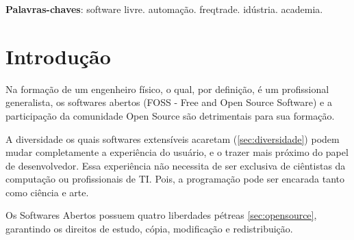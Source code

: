 \documentclass[
12pt,				%
openright,			%
oneside,			%
a4paper,			%
english,			%
french,				%
spanish,			%
brazil,				%
]{abntex2}
\begin{document}

\frenchspacing


\imprimircapa


\setlength{\absparsep}{18pt} %
\begin{resumo}
  
  
  \noindent
  \textbf{Palavras-chaves}: software livre. automação. freqtrade. idústria. academia.

\end{resumo}


\tableofcontents*


\textual

\chapter[Introdução]{Introdução}

Na formação de um engenheiro físico, o qual, por definição, é um profissional generalista, os softwares abertos (FOSS - Free and Open Source Software) e a participação da comunidade Open Source são detrimentais para sua formação.

A diversidade os quais softwares extensíveis acaretam (\autoref{sec:diversidade}) podem mudar completamente a experiência do usuário, e o trazer mais próximo do papel de desenvolvedor. Essa experiência não necessita de ser exclusiva de ciêntistas da computação ou profissionais de TI. Pois, a programação pode ser encarada tanto como ciência e arte.

Os Softwares Abertos possuem quatro liberdades pétreas \autoref{sec:opensource}{}, garantindo os direitos de estudo, cópia, modificação e redistribuição.
\end{document}
